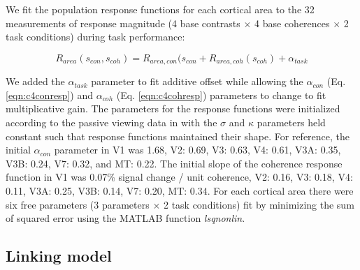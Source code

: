 We fit the population response functions for each cortical area to the 32 measurements of response magnitude (4 base contrasts $\times$ 4 base coherences $\times$ 2 task conditions) during task performance:

\begin{equation}
    R_{area}(s_{con},s_{coh})=R_{area,con}(s_{con}+R_{area,coh}(s_{coh})+\alpha_{task}
    \label{eqn:c4r_area}
\end{equation}

We added the $\alpha_{task}$ parameter to fit additive offset while allowing the $\alpha_{con}$ (Eq. \ref{eqn:c4conresp}) and $\alpha_{coh}$ (Eq. \ref{eqn:c4cohresp}) parameters to change to fit multiplicative gain. The parameters for the response functions were initialized according to the passive viewing data in \citet{Birman2018-sp} with the $\sigma$ and $\kappa$ parameters held constant such that response functions maintained their shape. For reference, the initial $\alpha_{con}$ parameter in V1 was 1.68, V2: 0.69, V3: 0.63, V4: 0.61, V3A: 0.35, V3B: 0.24, V7: 0.32, and MT: 0.22. The initial slope of the coherence response function in V1 was 0.07\% signal change / unit coherence, V2: 0.16, V3: 0.18, V4: 0.11, V3A: 0.25, V3B: 0.14, V7: 0.20, MT: 0.34. For each cortical area there were six free parameters (3 parameters $\times$ 2 task conditions) fit by minimizing the sum of squared error using the MATLAB function \textit{lsqnonlin}.   

\subsection{Linking model}

